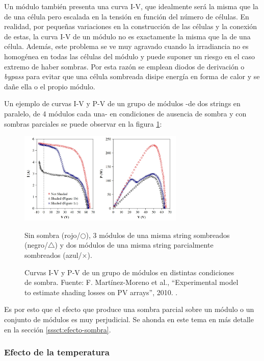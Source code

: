 Un \gls{módulo} también presenta una curva I-V, que idealmente será la misma que la de una célula pero escalada en la tensión en función del número de células. En realidad, por pequeñas variaciones en la construcción de las células y la conexión de estas, la \gls{curva I-V} de un módulo no es exactamente la misma que la de una célula. Además, este problema se ve muy agravado cuando la \gls{irradiancia} no es homogénea en todas las células del módulo y puede suponer un riesgo en el caso extremo de haber sombras. Por esta razón se emplean diodos de derivación o \textit{bypass} para evitar que una célula sombreada disipe energía en forma de calor y se dañe ella o el propio módulo.

Un ejemplo de curvas I-V y P-V de un grupo de módulos -de dos \glspl{string} en paralelo, de 4 módulos cada una- en condiciones de ausencia de sombra y con sombras parciales se puede observar en la figura \ref{fig:iv_pv_curve}:

\begin{figure}[H]
      \centering
      \includegraphics[width=0.7\textwidth]{./images/SoA_irrad/IV_PV_Curve_Module_Under_Shading.jpg}
      \caption{Curvas I-V y P-V de un grupo de módulos en distintas condiciones de sombra. Fuente: F. Martínez-Moreno et al., ``Experimental model to estimate shading losses on PV arrays'', 2010. \cite[Fig. 3]{Martínez-Moreno_Muñoz_Lorenzo_2010}.}
      \label{fig:iv_pv_curve}
      Sin sombra (rojo/$\bigcirc$), 3 módulos de una misma \gls{string} sombreados (negro/$\triangle$) y dos módulos de una misma \gls{string} parcialmente sombreados (azul/$\times$).
\end{figure}

Es por esto que el efecto que produce una sombra parcial sobre un módulo o un conjunto de módulos es muy perjudicial. Se ahonda en este tema en más detalle en la sección \ref{sssct:efecto-sombra}.

\subsubsection{Efecto de la temperatura}

